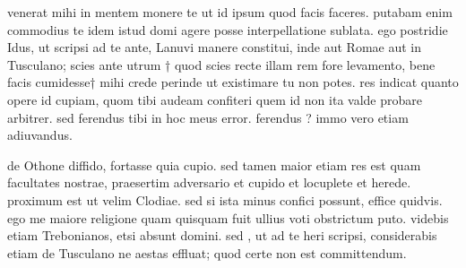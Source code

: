 


 venerat mihi in mentem monere te ut id ipsum quod facis faceres. putabam enim commodius te idem istud domi agere posse interpellatione sublata. ego postridie Idus, ut scripsi ad te ante, Lanuvi manere constitui, inde aut Romae aut in Tusculano; scies ante utrum † quod scies recte illam rem fore levamento, bene facis cumidesse† mihi crede perinde ut existimare tu non potes. res indicat quanto opere id cupiam, quom tibi audeam confiteri quem id non ita valde probare arbitrer. sed ferendus tibi in hoc meus error. ferendus ? immo vero etiam adiuvandus.

 de Othone diffido, fortasse quia cupio. sed tamen maior etiam res est quam facultates nostrae, praesertim adversario et cupido et locuplete et herede. proximum est ut velim Clodiae. sed si ista minus confici possunt, effice quidvis. ego me maiore religione quam quisquam fuit ullius voti obstrictum puto. videbis etiam Trebonianos, etsi absunt domini. sed , ut ad te heri scripsi, considerabis etiam de Tusculano ne aestas effluat; quod certe non est committendum.
